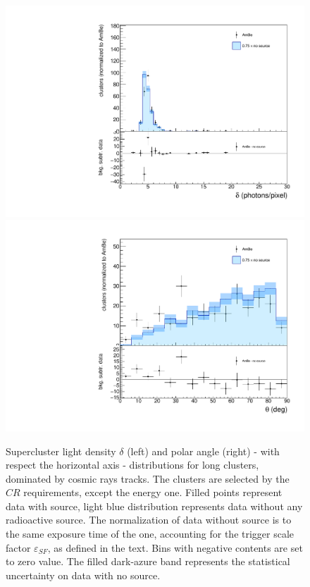 \begin{figure}[ht]
  \begin{center}
  \includegraphics[width=0.45\linewidth]{figures/density_cosmics}
  \includegraphics[width=0.45\linewidth]{figures/inclination_cosmics}

  \caption{Supercluster light density $\delta$ (left) and polar angle
    (right) - with respect the horizontal axis - distributions for
    long clusters, dominated by cosmic rays tracks. The clusters are
    selected by the $CR$ requirements, except the energy one.  Filled
    points represent data with \ambe source, light blue distribution
    represents data without any radioactive source.  The normalization
    of data without source is to the same exposure time of the \ambe
    one, accounting for the trigger scale factor $\varepsilon_{SF}$,
    as defined in the text. Bins with negative contents are set to
    zero value. The filled dark-azure band represents the statistical
    uncertainty on data with no source. \label{fig:cosmics}}

\end{center}
\end{figure}
